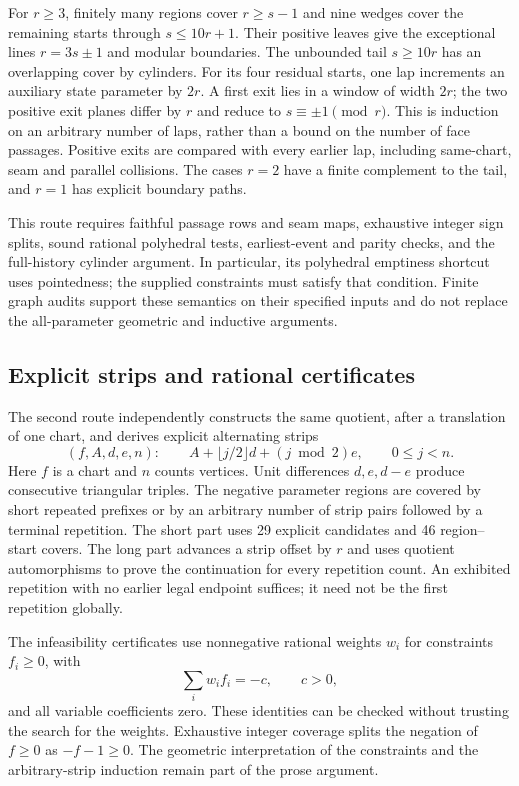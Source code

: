 \documentclass[11pt]{amsart}
\theoremstyle{definition}\newtheorem{definition}{Definition}
\begin{document}
For $r\ge3$, finitely many regions cover $r\ge s-1$ and nine wedges
cover the remaining starts through $s\le10r+1$. Their positive leaves
give the exceptional lines $r=3s\pm1$ and modular boundaries.
The unbounded tail $s\ge10r$ has an overlapping cover by cylinders.
For its four residual starts, one lap increments an auxiliary state
parameter by $2r$. A first exit lies in a window of width $2r$;
the two positive exit planes differ by $r$ and reduce to
$s\equiv\pm1\pmod r$. This is induction on an arbitrary number
of laps, rather than a bound on the number of face passages.
Positive exits are compared with every earlier lap, including
same-chart, seam and parallel collisions. The cases $r=2$ have
a finite complement to the tail, and $r=1$ has explicit boundary paths.

This route requires faithful passage rows and seam maps, exhaustive
integer sign splits, sound rational polyhedral tests, earliest-event
and parity checks, and the full-history cylinder argument. In
particular, its polyhedral emptiness shortcut uses pointedness;
the supplied constraints must satisfy that condition. Finite graph
audits support these semantics on their specified inputs and do not
replace the all-parameter geometric and inductive arguments.

\subsection{Explicit strips and rational certificates}
The second route independently constructs the same quotient, after a
translation of one chart, and derives explicit alternating strips
\[
 (f,A,d,e,n):\qquad A+\lfloor j/2\rfloor d+(j\bmod2)e,
                  \qquad 0\le j<n.
\]
Here $f$ is a chart and $n$ counts vertices. Unit differences
$d,e,d-e$ produce consecutive triangular triples. The negative
parameter regions are covered by short repeated prefixes or by
an arbitrary number of strip pairs followed by a terminal repetition.
The short part uses 29 explicit candidates and 46 region--start covers.
The long part advances a strip offset by $r$ and uses quotient
automorphisms to prove the continuation for every repetition count.
An exhibited repetition with no earlier legal endpoint suffices;
it need not be the first repetition globally.

The infeasibility certificates use nonnegative rational weights
$w_i$ for constraints $f_i\ge0$, with
\[
 \sum_i w_i f_i=-c,\qquad c>0,
\]
and all variable coefficients zero. These identities can be checked
without trusting the search for the weights. Exhaustive integer
coverage splits the negation of $f\ge0$ as $-f-1\ge0$.
The geometric interpretation of the constraints and the arbitrary-strip
induction remain part of the prose argument.
\end{document}
